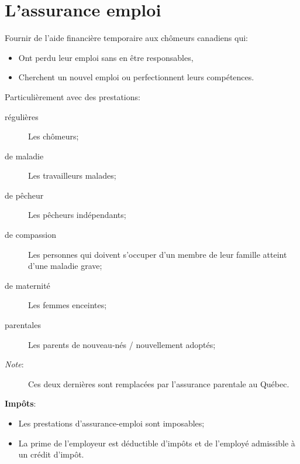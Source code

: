 \documentclass[10pt, french]{article}
\begin{document}
\begin{multicols*}{3}
\begin{definitionNOHFILLsub}
\end{definitionNOHFILLsub}

\newpage

\section{L’assurance emploi}

\begin{definitionNOHFILLsub}[Objectifs]
Fournir de l'aide financière temporaire aux chômeurs canadiens qui:
\begin{itemize}[leftmargin = *]
	\item	Ont perdu leur emploi sans en être responsables,
	\item	Cherchent un nouvel emploi ou perfectionnent leurs compétences.
\end{itemize}

Particulièrement avec des prestations:
\begin{description}
	\item[régulières]	Les chômeurs;	
	\item[de maladie]	Les travailleurs malades;
	\item[de pêcheur]	Les pêcheurs indépendants;
	\item[de compassion]	Les personnes qui doivent s'occuper d'un membre de leur famille atteint d'une maladie grave;
	\item[de maternité]	Les femmes enceintes;
	\item[parentales]	Les parents de nouveau-nés / nouvellement adoptés;
	\item[\textit{Note}:]	Ces deux dernières sont remplacées par l'assurance parentale au Québec.
\end{description}
\end{definitionNOHFILLsub}

\begin{definitionNOHFILLsub}[Fiscalité]
\textbf{Impôts}:
\begin{itemize}[leftmargin = *]
	\item	Les prestations d'assurance-emploi sont imposables;
	\item	La prime de l'employeur est déductible d'impôts et de l'employé admissible à un crédit d'impôt.
\end{itemize}


\end{definitionNOHFILLsub}
\end{multicols*}
\end{document}
